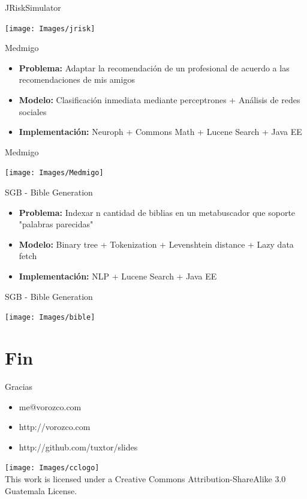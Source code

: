 \documentclass{beamer}
\begin{document}
\begin{frame}{JRiskSimulator}
    \begin{center}
        \texttt{[image: Images/jrisk]}
    \end{center}
\end{frame}

\begin{frame}{Medmigo}
    \begin{itemize}
        \item \textbf{Problema:} Adaptar la recomendación de un profesional de acuerdo a las recomendaciones de mis amigos
        \item \textbf{Modelo: } Clasificación inmediata mediante perceptrones + Análisis de redes sociales
        \item \textbf{Implementación: } Neuroph + Commons Math + Lucene Search + Java EE 
    \end{itemize}
\end{frame}

\begin{frame}{Medmigo}
    \begin{center}
        \texttt{[image: Images/Medmigo]}
    \end{center}
\end{frame}

\begin{frame}{SGB - Bible Generation}
    \begin{itemize}
        \item \textbf{Problema:} Indexar n cantidad de biblias en un metabuscador que soporte "palabras parecidas"
        \item \textbf{Modelo: } Binary tree + Tokenization + Levenshtein distance + Lazy data fetch
         \item \textbf{Implementación: } NLP + Lucene Search + Java EE 
    \end{itemize}
\end{frame}

\begin{frame}{SGB - Bible Generation}
    \begin{center}
        \texttt{[image: Images/bible]}
    \end{center}
\end{frame}


\section{Fin}

\begin{frame}{Gracias}
\begin{itemize}
\item me@vorozco.com
\item http://vorozco.com
\item http://github.com/tuxtor/slides
\end{itemize}
\begin{center}
\texttt{[image: Images/cclogo]}
\\
This work is licensed under a Creative Commons Attribution-ShareAlike 3.0 Guatemala License.
\end{center}
\end{frame}
\end{document}
